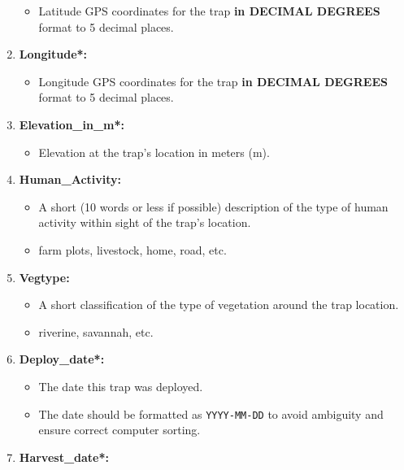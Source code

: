 \documentclass[letterpaper]{scrreprt}
\begin{document}
\begin{enumerate}
  \begin{itemize}
  \itemsep1pt\parskip0pt
  \item
    Latitude GPS coordinates for the trap \textbf{in DECIMAL DEGREES}
    format to 5 decimal places.
  \end{itemize}
\item
  \textbf{Longitude*:}

  \begin{itemize}
  \itemsep1pt\parskip0pt
  \item
    Longitude GPS coordinates for the trap \textbf{in DECIMAL DEGREES}
    format to 5 decimal places.
  \end{itemize}
\item
  \textbf{Elevation\_in\_m*:}

  \begin{itemize}
  \itemsep1pt\parskip0pt
  \item
    Elevation at the trap's location in meters (m).
  \end{itemize}
\item
  \textbf{Human\_Activity:}

  \begin{itemize}
  \itemsep1pt\parskip0pt
  \item
    A short (10 words or less if possible) description of the type of
    human activity within sight of the trap's location.
  \item
    farm plots, livestock, home, road, etc.
  \end{itemize}
\item
  \textbf{Vegtype:}

  \begin{itemize}
  \itemsep1pt\parskip0pt
  \item
    A short classification of the type of vegetation around the trap
    location.
  \item
    riverine, savannah, etc.
  \end{itemize}
\item
  \textbf{Deploy\_date*:}

  \begin{itemize}
  \itemsep1pt\parskip0pt
  \item
    The date this trap was deployed.
  \item
    The date should be formatted as \texttt{YYYY-MM-DD} to avoid
    ambiguity and ensure correct computer sorting.
  \end{itemize}
\item
  \textbf{Harvest\_date*:}


\end{enumerate}
\end{document}
